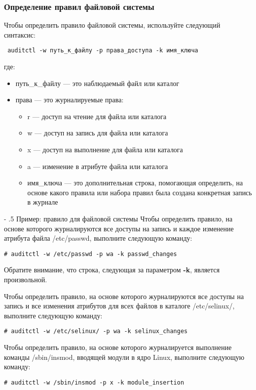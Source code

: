 \documentclass[a4paper,10pt,twoside]{article}
\makeatletter
\renewcommand\paragraph{%
   \@startsection{paragraph}{4}{0mm}%
      {-\baselineskip}%
      {.5\baselineskip}%
      {\normalfont\normalsize\bfseries}}
\makeatother
\begin{document}
\subsubsection{Определение правил файловой системы}
Чтобы определить правило файловой системы, используйте следующий синтаксис:
\begin{verbatim}
 auditctl -w путь_к_файлу -p права_доступа -k имя_ключа
\end{verbatim} 
где:
\begin{itemize}
 \item путь\_к\_файлу — это наблюдаемый файл или каталог
 \item права — это журналируемые права:
 \begin{itemize}
\item r — доступ на чтение для файла или каталога
\item w — доступ на запись для файла или каталога
\item x — доступ на выполнение для файла или каталога
\item a — изменение в атрибуте файла или каталога
\item имя\_ключа — это дополнительная строка, помогающая определить, на основе какого правила или набора правил была создана конкретная запись в журнале
\end{itemize}
\end{itemize}


\paragraph{Пример: правило для файловой системы}
Чтобы определить правило, на основе которого журналируются все доступы на запись и каждое изменение атрибута файла /etc/passwd, выполните следующую команду:
\begin{verbatim}
# auditctl -w /etc/passwd -p wa -k passwd_changes
\end{verbatim} 
Обратите внимание, что строка, следующая за параметром \textbf{-k}, является произвольной.

Чтобы определить правило, на основе которого журналируются все доступы на запись и все изменения атрибутов для всех файлов в каталоге /etc/selinux/, выполните следующую команду:
\begin{verbatim}
# auditctl -w /etc/selinux/ -p wa -k selinux_changes
\end{verbatim} 

Чтобы определить правило, на основе которого журналируется выполнение команды /sbin/insmod, вводящей модули в ядро Linux, выполните следующую команду: 
\begin{verbatim}
# auditctl -w /sbin/insmod -p x -k module_insertion
\end{verbatim} 
\end{document}
